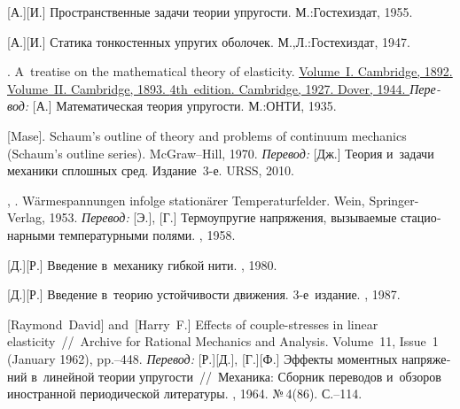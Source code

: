 \begin{thebibliography}{123}
\begin{otherlanguage}{russian}
[А.][И.] Пространственные задачи теории упругости. М.:\;Гос\-тех\-издат, 1955. 

[А.][И.] Статика тонкостенных упругих оболочек. М.,\:Л.:\;Гос\-тех\-издат, 1947. 

. A~treatise on the mathematical theory of elasticity.
\href{https://hal.archives-ouvertes.fr/hal-01307751/document}{Volume~I. Cambridge, 1892. }
\href{https://archive.org/details/in.ernet.dli.2015.503659}{Volume~II. Cambridge, 1893. }
\href{https://archive.org/details/in.ernet.dli.2015.462644/page/n1}{4th~edition. Cambridge, 1927. Dover, 1944. }
\emph{Перевод:} [А.] Математическая теория упругости. М.:\;ОНТИ, 1935. 

[Mase]. Schaum’s outline of theory and problems of continuum mechanics (Schaum’s outline series). McGraw\hbox{--}Hill, 1970. 
\emph{Перевод:} [Дж.] Теория и~задачи механики сплошных сред. Издание~3\hbox{-}е. URSS, 2010. 

, . Wärmespannungen infolge stationärer Temperaturfelder. Wein, Springer-Verlag, 1953. 
\emph{Перевод:} [Э.], [Г.] Термоупругие напряжения, вызываемые стационарными температурными полями. \fizmatgiz, 1958. 

[Д.][Р.] Введение в~механику гибкой нити. \naukapublisher, 1980. 

[Д.][Р.] Введение в~теорию устойчивости движения. 3\hbox{-}е~издание. \naukapublisher, 1987. 

[Raymond~David] %
and~[Harry~F.] %
Effects of couple-stresses in linear elasticity~//~Archive for Rational Mechanics and Analysis. Volume~11, Issue~1 (January 1962), pp.\hbox{--}448.
\emph{Перевод:}
[Р.][Д.], [Г.][Ф.]
Эффекты моментных напряжений в~линейной теории упругости~//~Механика: Сборник переводов и~обзоров иностранной периодической литературы. \mirpublisher, 1964. №\,4\:(86). С.\hbox{--}114.


\end{otherlanguage}
\end{thebibliography}
